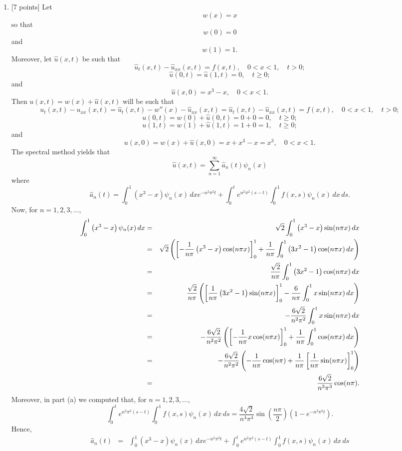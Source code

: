 \begin{solution}
\begin{enumerate}
\item {[7 points]} Let
\[
w(x)=x
\]
so that
\[
w(0)=0
\]
and
\[
w(1)=1.
\]
Moreover, let $\hat{u}(x,t)$ be such that
\[
\hat{u}_t(x,t)-\hat{u}_{xx}(x,t) = f(x,t),\quad 0<x<1,\quad t>0;
\]
\[
\hat{u}(0,t) = \hat{u}(1,t) = 0,\quad t\ge0;
\]
and
\[
\hat{u}(x,0)=x^3-x,\quad 0<x<1.
\]
Then $u(x,t)=w(x)+\hat{u}(x,t)$ will be such that
\[
u_t(x,t)-u_{xx}(x,t)=\hat{u}_t(x,t)-w''(x)-\hat{u}_{xx}(x,t) = \hat{u}_t(x,t)-\hat{u}_{xx}(x,t) = f(x,t),\quad 0<x<1,\quad t>0;
\]
\[
u(0,t) = w(0) + \hat{u}(0,t) = 0+0 = 0,\quad t\ge0;
\]
\[
u(1,t) = w(1) + \hat{u}(1,t) = 1+0 = 1,\quad t\ge0;
\]
and
\[
u\left(x,0\right)=w(x)+\hat{u}(x,0)=x+x^3-x=x^3,\quad 0<x<1.
\]
The spectral method yields that
\[
\hat{u}(x,t)=\sum_{n=1}^\infty \hat{a}_n(t)\psi_n(x)
\]
where
\[
\hat{a}_n(t)=\int_0^1\left(x^3-x\right)\psi_n(x)\,dx e^{-n^2\pi^2t}+\int_0^te^{n^2\pi^2\left(s-t\right)}\int_0^1f(x,s)\psi_n(x)\,dx\,ds.
\]
Now, for $n=1,2,3,\ldots$,
\begin{eqnarray*}
\int_0^1\left(x^3-x\right)\psi_n(x)\,dx&=& \sqrt{2}\int_0^1 \left(x^3-x\right)\sin(n\pi x)\,dx
\\
&=&\sqrt{2}\left(\left[-{1 \over n\pi}\left(x^3-x\right)\cos(n\pi x)\right]_0^1+{1 \over n\pi}\int_0^1 \left(3x^2-1\right)\cos(n\pi x)\,dx\right)
\\
&=&{\sqrt{2} \over n\pi}\int_0^1 \left(3x^2-1\right)\cos(n\pi x)\,dx
\\
&=&{\sqrt{2} \over n\pi}\left(\left[{1 \over n\pi}\left(3x^2-1\right)\sin(n\pi x)\right]_0^1-{6 \over n\pi}\int_0^1 x\sin(n\pi x)\,dx\right)
\\
&=&-{6\sqrt{2} \over n^2\pi^2}\int_0^1 x\sin(n\pi x)\,dx
\\
&=&-{6\sqrt{2} \over n^2\pi^2}\left(\left[-{1 \over n\pi}x\cos(n\pi x)\right]_0^1+{1 \over n\pi}\int_0^1 \cos(n\pi x)\,dx\right)
\\
&=&-{6\sqrt{2} \over n^2\pi^2}\left(-{1 \over n\pi}\cos(n\pi)+{1 \over n\pi}\left[{1 \over n\pi} \sin(n\pi x)\right]_0^1\right)
\\
&=&{6\sqrt{2} \over n^3\pi^3}\cos(n\pi).
\end{eqnarray*}
Moreover, in part (a) we computed that, for $n=1,2,3,\ldots$,
\[
\int_0^te^{n^2\pi^2\left(s-t\right)}\int_0^1f(x,s)\psi_n(x)\,dx\,ds=\frac{4\sqrt{2}}{n^4\pi^4}\sin\left(\frac{n\pi}{2}\right)\left(1-e^{-n^2\pi^2t}\right).
\]
Hence,
\begin{eqnarray*}
\hat{a}_n(t)&=&\int_0^1\left(x^3-x\right)\psi_n(x)\,dx e^{-n^2\pi^2t}+\int_0^te^{n^2\pi^2\left(s-t\right)}\int_0^1f(x,s)\psi_n(x)\,dx\,ds

\end{eqnarray*}
\end{enumerate}
\end{solution}
